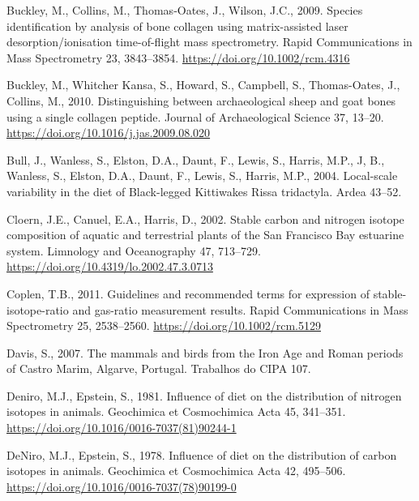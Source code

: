 \documentclass[preprint, 3p, authoryear]{elsarticle} %
\newlength{\cslhangindent}
\newlength{\cslentryspacingunit} %
\newenvironment{CSLReferences}[2] %
 {%
  \setlength{\parindent}{0pt}
  \ifodd #1
  \let\oldpar\par
  \def\par{\hangindent=\cslhangindent\oldpar}
  \fi
  \setlength{\parskip}{#2\cslentryspacingunit}
 }%
 {}
\begin{document}
\begin{CSLReferences}{1}{0}
\leavevmode{}%
Buckley, M., Collins, M., Thomas‐Oates, J., Wilson, J.C., 2009. Species identification by analysis of bone collagen using matrix-assisted laser desorption/ionisation time-of-flight mass spectrometry. Rapid Communications in Mass Spectrometry 23, 3843--3854. \url{https://doi.org/10.1002/rcm.4316}

\leavevmode{}%
Buckley, M., Whitcher Kansa, S., Howard, S., Campbell, S., Thomas-Oates, J., Collins, M., 2010. Distinguishing between archaeological sheep and goat bones using a single collagen peptide. Journal of Archaeological Science 37, 13--20. \url{https://doi.org/10.1016/j.jas.2009.08.020}

\leavevmode{}%
Bull, J., Wanless, S., Elston, D.A., Daunt, F., Lewis, S., Harris, M.P., J, B., Wanless, S., Elston, D.A., Daunt, F., Lewis, S., Harris, M.P., 2004. Local-scale variability in the diet of {Black}-legged {Kittiwakes Rissa} tridactyla. Ardea 43--52.

\leavevmode{}%
Cloern, J.E., Canuel, E.A., Harris, D., 2002. Stable carbon and nitrogen isotope composition of aquatic and terrestrial plants of the {San Francisco Bay} estuarine system. Limnology and Oceanography 47, 713--729. \url{https://doi.org/10.4319/lo.2002.47.3.0713}

\leavevmode{}%
Coplen, T.B., 2011. Guidelines and recommended terms for expression of stable-isotope-ratio and gas-ratio measurement results. Rapid Communications in Mass Spectrometry 25, 2538--2560. \url{https://doi.org/10.1002/rcm.5129}

\leavevmode{}%
Davis, S., 2007. The mammals and birds from the {Iron Age} and {Roman} periods of {Castro Marim}, {Algarve}, {Portugal}. Trabalhos do CIPA 107.

\leavevmode{}%
Deniro, M.J., Epstein, S., 1981. Influence of diet on the distribution of nitrogen isotopes in animals. Geochimica et Cosmochimica Acta 45, 341--351. \url{https://doi.org/10.1016/0016-7037(81)90244-1}

\leavevmode{}%
DeNiro, M.J., Epstein, S., 1978. Influence of diet on the distribution of carbon isotopes in animals. Geochimica et Cosmochimica Acta 42, 495--506. \url{https://doi.org/10.1016/0016-7037(78)90199-0}


\end{CSLReferences}
\end{document}
